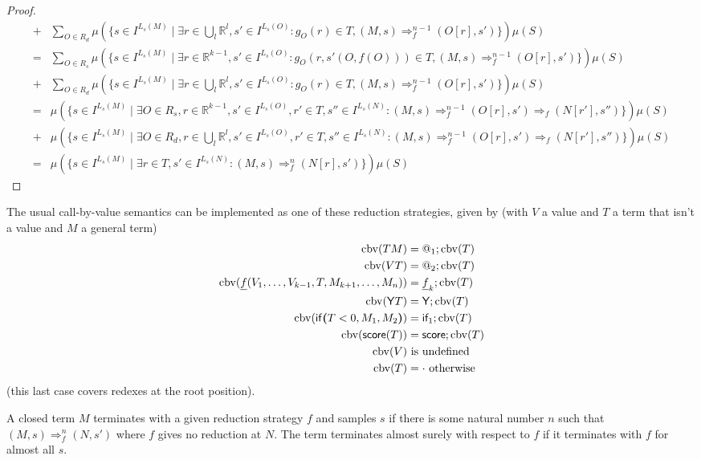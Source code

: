 \begin{proof}
\begin{align*}
    + & \sum_{O \in R_d} \mu(\{s \in I^{L_s(M)} \mid \exists r \in \bigcup_l \mathbb R^l, s' \in I^{L_s(O)}: g_O(r) \in T, (M,s) \Rightarrow_f^{n-1} (O[r], s')\}) \mu(S) \\
= & \sum_{O \in R_s} \mu(\{s \in I^{L_s(M)} \mid \exists r \in \mathbb R^{k-1}, s' \in I^{L_s(O)} : g_O(r,s'(O,f(O))) \in T, (M,s) \Rightarrow_f^{n-1} (O[r], s')\}) \mu(S)\\
    + & \sum_{O \in R_d} \mu(\{s \in I^{L_s(M)} \mid \exists r \in \bigcup_l \mathbb R^l, s' \in I^{L_s(O)}: g_O(r) \in T, (M,s) \Rightarrow_f^{n-1} (O[r], s')\}) \mu(S) \\
= & \mu(\{s \in I^{L_s(M)} \mid \exists O \in R_s, r \in \mathbb R^{k-1}, s' \in I^{L_s(O)}, r' \in T, s'' \in I^{L_s(N)} : (M,s) \Rightarrow_f^{n-1} (O[r], s') \Rightarrow_f (N[r'], s'')\}) \mu(S)\\
    + & \mu(\{s \in I^{L_s(M)} \mid \exists O \in R_d, r \in \bigcup_l \mathbb R^l, s' \in I^{L_s(O)}, r' \in T, s'' \in I^{L_s(N)} : (M,s) \Rightarrow_f^{n-1} (O[r], s') \Rightarrow_f (N[r'], s'')\}) \mu(S) \\
= & \mu(\{s \in I^{L_s(M)} \mid \exists r \in T, s' \in I^{L_s(N)} : (M,s) \Rightarrow_f^n (N[r], s')\}) \mu(S)
\end{align*}
\end{proof}
\clearpage



The usual call-by-value semantics can be implemented as one of these reduction strategies, given by (with $V$ a value and $T$ a term that isn't a value and $M$ a general term)
\begin{align*}
\operatorname{cbv}(T M) & = @_1 ; \operatorname{cbv}(T) \\
\operatorname{cbv}(V T) & = @_2 ; \operatorname{cbv}(T) \\
\operatorname{cbv}(\underline f(V_1, \dots, V_{k-1}, T, M_{k+1}, \dots, M_n)) & = \underline f_k ; \operatorname{cbv}(T) \\
\operatorname{cbv}(\mathsf{Y} T) & = \mathsf{Y} ; \operatorname{cbv}(T) \\
\operatorname{cbv}(\mathsf{if}\boldsymbol{(}T < 0, M_1, M_2\boldsymbol{)}) & = \textsf{if}_1 ; \operatorname{cbv}(T) \\
\operatorname{cbv}(\mathsf{score}(T)) & = \mathsf{score} ; \operatorname{cbv}(T) \\
\operatorname{cbv}(V) & \text{ is undefined} \\
\operatorname{cbv}(T) & = \cdot \text{ otherwise}
\end{align*}
(this last case covers redexes at the root position).

A closed term $M$ terminates with a given reduction strategy $f$ and samples $s$ if there is some natural number $n$ such that $(M,s) \Rightarrow_f^n (N,s')$ where $f$ gives no reduction at $N$. The term terminates almost surely with respect to $f$ if it terminates with $f$ for almost all $s$.

